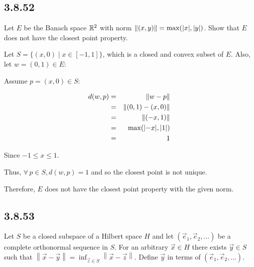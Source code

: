 \documentclass[letterpaper,12pt,fleqn]{article}
\newcommand{\ve}{\vec{e}}
\newcommand{\vx}{\vec{x}}
\newcommand{\vy}{\vec{y}}
\newcommand{\vz}{\vec{z}}
\newcommand{\norm}[1]{\left\|#1\right\|}
\begin{document}
\subsection*{3.8.52}

Let $E$ be the Banach space $\mathbb{R}^2$ with norm
$\norm{(x,y)}=\max(\abs{x},\abs{y})$. Show that $E$ does not have the closest
point property.

Let $S=\{(x,0)\mid x\in[-1,1]\}$, which is a closed and convex subset of $E$.
Also, let $w=(0,1)\in E$:

\begin{minipage}{3.5in}
\end{minipage}
\begin{minipage}{3in}
  Assume $p=(x,0)\in S$:
  
  \begin{eqnarray*}
    d(w,p) &=& \norm{w-p} \\
    &=& \norm{(0,1)-(x,0)} \\
    &=& \norm{(-x,1)} \\
    &=&\max(\abs{-x},\abs{1}) \\
    &=& 1
  \end{eqnarray*}
  
  Since $-1\le x\le1$.
\end{minipage}

Thus, $\forall\,p\in S,d(w,p)=1$ and so the closest point is not unique.

Therefore, $E$ does not have the closest point property with the given norm.

\subsection*{3.8.53}

Let $S$ be a closed subspace of a Hilbert space $H$ and let
$(\ve_1,\ve_2,\ldots)$ be a complete orthonormal sequence in $S$. For an
arbitrary $\vx\in H$ there exists $\vy\in S$ such that
$\norm{\vx-\vy}=\inf_{\vz\in S}\norm{\vx-\vz}$. Define $\vy$ in terms of
$(\ve_1,\ve_2,\ldots)$.
\end{document}
